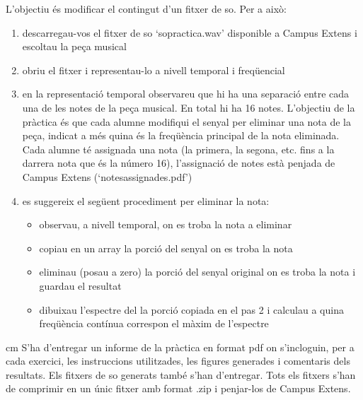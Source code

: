 \documentclass{article}
\begin{document}
L'objectiu és modificar el contingut d'un fitxer de so.
Per a això:
\begin{enumerate}[1)]
\item descarregau-vos el fitxer de so  `sopractica.wav' disponible a Campus Extens i escoltau la peça musical
\item obriu el fitxer i representau-lo a nivell temporal i freqüencial
\item en la representació temporal observareu que hi ha una separació entre cada una de les notes de la peça musical.
En total hi ha 16 notes. L'objectiu de la pràctica és que cada alumne modifiqui el senyal per eliminar una nota de la peça, indicat a més
quina és la freqüència principal de la nota eliminada. Cada alumne té assignada una nota (la primera, la segona, etc. fins a la
darrera nota que és la número 16), l'assignació de notes està penjada de Campus Extens (`notesassignades.pdf')
\item es suggereix el següent procediment per eliminar la nota:
\begin{itemize}
\item observau, a nivell temporal, on es troba la nota a eliminar
\item copiau en un array la porció del senyal on es troba la nota
\item eliminau (posau a zero) la porció del senyal original on es troba la nota i guardau el resultat
\item dibuixau l'espectre del la porció copiada en el pas 2 i calculau a quina freqüència
contínua correspon el màxim de l'espectre
\end{itemize}
\end{enumerate}




 cm
\noindent
S'ha d'entregar un informe de la pràctica en format pdf on s'incloguin, per a cada exercici, 
les instruccions utilitzades, les figures generades i comentaris dels resultats. Els fitxers de so generats també s'han d'entregar.
Tots els fitxers s'han de comprimir en un únic fitxer amb format .zip i penjar-los de Campus Extens.
\end{document}
